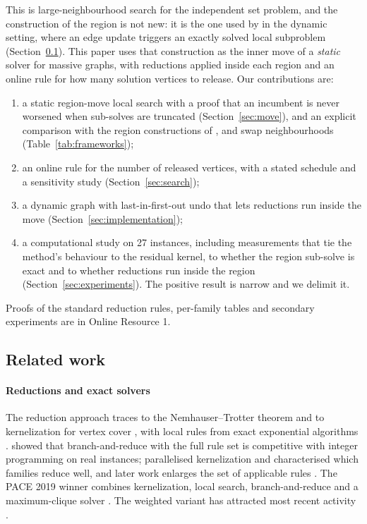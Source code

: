 \documentclass[pdflatex,sn-mathphys-num]{sn-jnl}
\theoremstyle{thmstyleone}%
\theoremstyle{thmstyletwo}%
\begin{document}
This is large-neighbourhood search \citep{hashimoto2019,katzmann2017} for the
independent set problem, and the construction of the region is not new: it is the
one used by \citet{borowitz2025} in the dynamic setting, where an edge update
triggers an exactly solved local subproblem (Section~\ref{sec:related}). This paper
uses that construction as the inner move of a \emph{static} solver for massive
graphs, with reductions applied inside each region and an online rule for how many
solution vertices to release. Our contributions are:
\begin{enumerate}
\item a static region-move local search with a proof that an incumbent is never
      worsened when sub-solves are truncated (Section~\ref{sec:move}), and an
      explicit comparison with the region constructions of \citet{borowitz2025},
      \citet{hashimoto2019} and swap neighbourhoods (Table~\ref{tab:frameworks});
\item an online rule for the number of released vertices, with a stated schedule
      and a sensitivity study (Section~\ref{sec:search});
\item a dynamic graph with last-in-first-out undo that lets reductions run inside
      the move (Section~\ref{sec:implementation});
\item a computational study on 27 instances, including measurements that tie the
      method's behaviour to the residual kernel, to whether the region sub-solve is
      exact and to whether reductions run inside the region
      (Section~\ref{sec:experiments}). The positive result is narrow and we
      delimit it.
\end{enumerate}
Proofs of the standard reduction rules, per-family tables and secondary experiments
are in Online Resource 1.

\subsection{Related work}
\label{sec:related}

\paragraph{Reductions and exact solvers} The reduction approach traces to the
Nemhauser--Trotter theorem \citep{nemhauser1975} and to kernelization for vertex
cover \citep{chen2001,abukhzam2007}, with local rules from exact exponential
algorithms \citep{tarjan1977,fomin2009,xiao2013,xiao2017}.
\citet{akiba2016} showed that branch-and-reduce with the full rule set is
competitive with integer programming on real instances; \citet{hespe2019}
parallelised kernelization and characterised which families reduce well, and later
work enlarges the set of applicable rules \citep{gellner2021,figiel2022,hespe2021}.
The PACE 2019 winner \citep{pace2019,hespe2020} combines kernelization, local search,
branch-and-reduce and a maximum-clique solver \citep{li2017momc}. The weighted
variant has attracted most recent activity
\citep{lamm2019,xiaowww2021,grossmann2023,langedal2022,grossmann2024survey,grossmann2025chils}.
\end{document}

